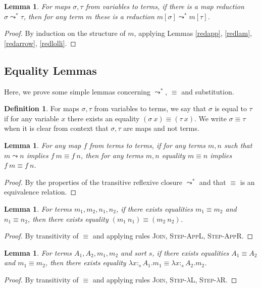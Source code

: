 \documentclass{article}
\newtheorem{lemma}[theorem]{Lemma}
\theoremstyle{definition}
\newtheorem{definition}{Definition}[section]
\newcommand{\rname}[1]{\textsc{\footnotesize #1}}
\newcommand{\stype}[1]{:_{#1}}
\newcommand{\step}{\leadsto}
\newcommand{\red}{\leadsto^*}
\begin{document}
\begin{lemma}\label{redcompat}
  For maps $\sigma, \tau$ from variables to terms, if there is a map reduction $\sigma \red \tau$, then for any term $m$ these is a reduction $m[\sigma] \red m[\tau]$.
\end{lemma}
\begin{proof}
  By induction on the structure of $m$, applying Lemmas \ref{redapp}, \ref{redlam}, \ref{redarrow}, \ref{redlolli}.
\end{proof}

\subsection{Equality Lemmas}
Here, we prove some simple lemmas concerning $\red$, $\equiv$ and substitution.

\begin{definition}
  For maps $\sigma, \tau$ from variables to terms, we say that $\sigma$ is equal to $\tau$ if for any variable $x$ there exists an equality $(\sigma\ x) \equiv (\tau\ x)$. We write $\sigma \equiv \tau$ when it is clear from context that $\sigma, \tau$ are maps and not terms.
\end{definition}

\begin{lemma}\label{convhom}
  For any map $f$ from terms to terms, if for any terms $m, n$ such that $m \step n$ implies $f\ m \equiv f\ n$, then for any terms $m, n$ equality $m \equiv n$ implies $f\ m \equiv f\ n$.
\end{lemma}
\begin{proof}
  By the properties of the transitive reflexive closure $\red$ and that $\equiv$ is an equivalence relation.
\end{proof}

\begin{lemma}\label{convapp}
  For terms $m_1, m_2, n_1, n_2$, if there exists equalities $m_1 \equiv m_2$ and $n_1 \equiv n_2$, then there exists equality $(m_1\ n_1) \equiv (m_2\ n_2)$.
\end{lemma}
\begin{proof}
  By transitivity of $\equiv$ and applying rules \rname{Join}, \rname{Step-AppL}, \rname{Step-AppR}.
\end{proof}

\begin{lemma}\label{convlam}
  For terms $A_1, A_2, m_1, m_2$ and sort $s$, if there exists equalities $A_1 \equiv A_2$ and $m_1 \equiv m_2$, then there exists equality $\lambda x \stype{s} A_1.m_1 \equiv \lambda x \stype{s} A_2.m_2$.
\end{lemma}
\begin{proof}
  By transitivity of $\equiv$ and applying rules \rname{Join}, \rname{Step-$\lambda$L}, \rname{Step-$\lambda$R}.
\end{proof}
\end{document}
